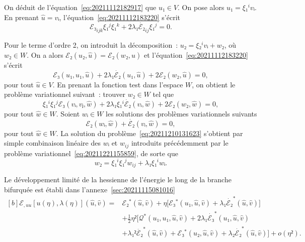 \documentclass[12pt, final]{amsart}
\begin{document}
On déduit de l'équation~\eqref{eq:20211112182917} que \(u₁∈V\). On pose alors
\(u₁=ξ₁^i vᵢ\). En prenant \(\hat{u}=vᵢ\), l'équation~\eqref{eq:20211112183220}
s'écrit
\begin{equation}
  ℰ₃_{ijk}ξ₁^jξ₁^k+2λ₁\dot{ℰ₂}_{ij}ξ₁^j=0.
\end{equation}

Pour le terme d'ordre 2, on introduit la décomposition~: \(u₂=ξ₂^ivᵢ+w₂\), où
\(w₂∈W\). On a alors \(ℰ₂(u₂, \hat{u})=ℰ₂(w₂, \hat{u})\) et
l'équation~\eqref{eq:20211112183220} s'écrit
\begin{equation}
  ℰ₃(u₁, u₁, \hat{u})+2λ₁\dot{ℰ₂}(u₁, \hat{u})
  +2ℰ₂(w₂, \hat{u})=0,
\end{equation}
pour tout \(\hat{u}∈V\). En prenant la fonction test dans l'espace \(W\), on
obtient le problème variationnel suivant~: trouver \(w₂∈W\) tel
que
\begin{equation}
  \label{eq:20211210131623}
  ξ₁^iξ₁^jℰ₃(vᵢ, vⱼ, \hat{w})
  +2λ₁ξ₁^i\dot{ℰ₂}(vᵢ, \hat{w})
  +2ℰ₂(w₂, \hat{w})=0,
\end{equation}
pour tout \(\hat{w}∈W\). Soient \(wᵢ∈W\) les solutions des problèmes
variationnels suivants
\begin{equation}
  ℰ₂(wᵢ, \hat{w})+\dot{ℰ₂}(vᵢ, \hat{w})=0,
\end{equation}
pour tout \(\hat{w}∈W\). La solution du problème~\eqref{eq:20211210131623}
s'obtient par simple combinaison linéaire des \(wᵢ\) et \(w_{ij}\) introduits
précédemment par le problème variationnel~\eqref{eq:20211221155859}, de sorte
que
\begin{equation}
  w₂=ξ₁^iξ₁^jw_{ij}+λ₁ξ₁^i wᵢ.
\end{equation}

Le développement limité de la hessienne de l'énergie le long de la branche
bifurquée est établi dans l'annexe~\ref{sec:20211115081016}
\begin{equation}
  \label{eq:20211115082025}
  \begin{aligned}[b]
    ℰ_{,uu}[u(η), λ(η)](\hat{u}, \hat{v})
    ={}&ℰ₂^*(\hat{u}, \hat{v})+η\bigl[ℰ₃^*(u₁, \hat{u}, \hat{v})
    +λ₁\dot{ℰ₂}^*(\hat{u}, \hat{v})\bigr]\\
    &+\tfrac12η²\bigl[𝒬^*(u₁, u₁, \hat{u}, \hat{v})
    +2λ₁\dot{ℰ₃}^*(u₁, \hat{u}, \hat{v})\\
    &+λ₁²\ddot{ℰ₂}^*(\hat{u}, \hat{v})+ℰ₃^*(u₂, \hat{u}, \hat{v})
    +λ₂\dot{ℰ₂}^*(\hat{u}, \hat{v})\bigr]+o(η²).
  \end{aligned}
\end{equation}
\end{document}

